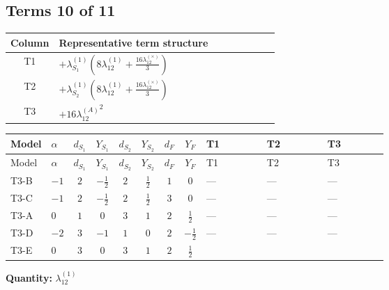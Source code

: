 \documentclass[8pt]{article}
\begin{document}
\begin{landscape}
\subsection*{Terms 10 of 11}
\begin{center}
\begin{tabular}{@{}c >{\raggedright\arraybackslash}p{0.82\linewidth}@{}}
\toprule
Column & Representative term structure \\
\midrule
T1 & \(\displaystyle +{\lambda_{S_1}^{(1)}} \left(8 {\lambda_{12}^{(1)}}+\frac{16 {\lambda_{12}^{(\times)}}}{3}\right)\) \\
\midrule
T2 & \(\displaystyle +{\lambda_{S_2}^{(1)}} \left(8 {\lambda_{12}^{(1)}}+\frac{16 {\lambda_{12}^{(\times)}}}{3}\right)\) \\
\midrule
T3 & \(\displaystyle +16 {\lambda_{12}^{(A)}}^2\) \\
\midrule
\bottomrule
\end{tabular}
\end{center}
\smallskip
\tiny
\begin{longtable}{@{}llcccccc >{\raggedright\arraybackslash}p{0.21\linewidth} >{\raggedright\arraybackslash}p{0.21\linewidth} >{\raggedright\arraybackslash}p{0.21\linewidth}@{}}
\toprule
Model & $\alpha$ & $d_{S_1}$ & $Y_{S_1}$ & $d_{S_2}$ & $Y_{S_2}$ & $d_F$ & $Y_F$ & T1 & T2 & T3 \\
\midrule
\endfirsthead
\toprule
Model & $\alpha$ & $d_{S_1}$ & $Y_{S_1}$ & $d_{S_2}$ & $Y_{S_2}$ & $d_F$ & $Y_F$ & T1 & T2 & T3 \\
\midrule
\endhead
T3-B & $-1$ & $2$ & $-\frac{1}{2}$ & $2$ & $\frac{1}{2}$ & $1$ & $0$ & --- & --- & --- \\
\midrule
T3-C & $-1$ & $2$ & $-\frac{1}{2}$ & $2$ & $\frac{1}{2}$ & $3$ & $0$ & --- & --- & --- \\
\midrule
T3-A & $0$ & $1$ & $0$ & $3$ & $1$ & $2$ & $\frac{1}{2}$ & --- & --- & --- \\
\midrule
T3-D & $-2$ & $3$ & $-1$ & $1$ & $0$ & $2$ & $-\frac{1}{2}$ & --- & --- & --- \\
\midrule
T3-E & $0$ & $3$ & $0$ & $3$ & $1$ & $2$ & $\frac{1}{2}$ & \scriptsize\adjustbox{max width=\linewidth}{$\begin{gathered} +{\lambda_{S_1}^{(1)}} \left(8 {\lambda_{12}^{(1)}}+\frac{16 {\lambda_{12}^{(\times)}}}{3}\right)\end{gathered}$} & \scriptsize\adjustbox{max width=\linewidth}{$\begin{gathered} +{\lambda_{S_2}^{(1)}} \left(8 {\lambda_{12}^{(1)}}+\frac{16 {\lambda_{12}^{(\times)}}}{3}\right)\end{gathered}$} & \scriptsize\adjustbox{max width=\linewidth}{$\begin{gathered} +16 {\lambda_{12}^{(A)}}^2\end{gathered}$} \\
\midrule
\bottomrule
\end{longtable}
\clearpage
\noindent\textbf{Quantity: }$\lambda_{12}^{(1)}$\par\smallskip

\end{landscape}
\end{document}
